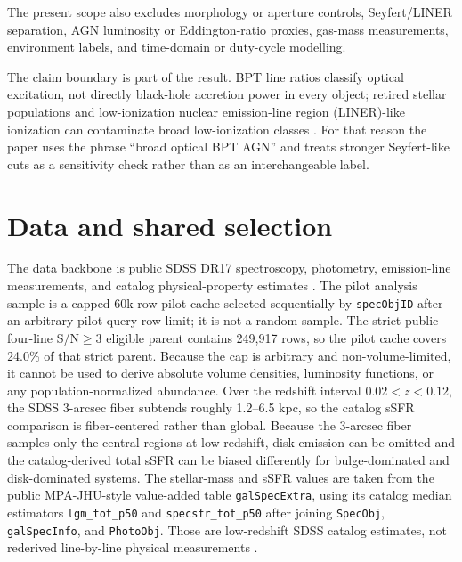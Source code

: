 \documentclass[twocolumn]{aastex631}
\begin{document}
The present scope also excludes morphology or aperture controls, Seyfert/LINER separation, AGN luminosity or Eddington-ratio proxies, gas-mass measurements, environment labels, and time-domain or duty-cycle modelling.

The claim boundary is part of the result. BPT line ratios classify optical excitation, not directly black-hole accretion power in every object; retired stellar populations and low-ionization nuclear emission-line region (LINER)-like ionization can contaminate broad low-ionization classes \citep{stasinska2008,stasinska2015}. For that reason the paper uses the phrase ``broad optical BPT AGN'' and treats stronger Seyfert-like cuts as a sensitivity check rather than as an interchangeable label.

\section{Data and shared selection}
The data backbone is public SDSS DR17 spectroscopy, photometry, emission-line measurements, and catalog physical-property estimates \citep{york2000,sdssdr17,brinchmann2004}. The pilot analysis sample is a capped 60k-row pilot cache selected sequentially by \texttt{specObjID} after an arbitrary pilot-query row limit; it is not a random sample. The strict public four-line S/N$\geq3$ eligible parent contains 249,917 rows, so the pilot cache covers 24.0\% of that strict parent. Because the cap is arbitrary and non-volume-limited, it cannot be used to derive absolute volume densities, luminosity functions, or any population-normalized abundance.
Over the redshift interval $0.02<z<0.12$, the SDSS 3-arcsec fiber subtends roughly 1.2--6.5 kpc, so the catalog sSFR comparison is fiber-centered rather than global.
Because the 3-arcsec fiber samples only the central regions at low redshift, disk emission can be omitted and the catalog-derived total sSFR can be biased differently for bulge-dominated and disk-dominated systems.
The stellar-mass and sSFR values are taken from the public MPA-JHU-style value-added table \texttt{galSpecExtra}, using its catalog median estimators \texttt{lgm\_tot\_p50} and \texttt{specsfr\_tot\_p50} after joining \texttt{SpecObj}, \texttt{galSpecInfo}, and \texttt{PhotoObj}. Those are low-redshift SDSS catalog estimates, not rederived line-by-line physical measurements \citep{brinchmann2004,sdssdr17,york2000}.
\end{document}
